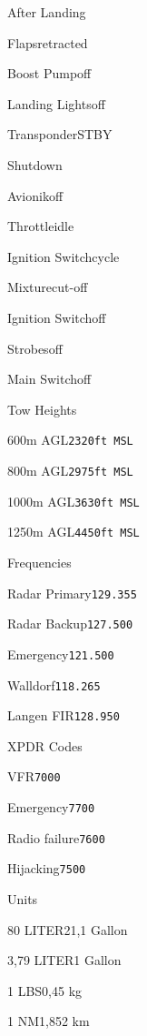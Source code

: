 \begin{checklist}{After Landing}
  \item{Flaps}{retracted}
  \item{Boost Pump}{off}
  \item{Landing Lights}{off}
  \item{Transponder}{STBY}
\end{checklist}

\begin{checklist}{Shutdown}
  \item{Avionik}{off}
  \item{Throttle}{idle}
  \item{Ignition Switch}{cycle}
  \item{Mixture}{cut-off}
  \item{Ignition Switch}{off}
  \item{Strobes}{off}
  \item{Main Switch}{off}
\end{checklist}

\begin{checklist}{Tow Heights}
  \item{600m AGL}{\texttt{2320ft MSL}}
  \item{800m AGL}{\texttt{2975ft MSL}}
  \item{1000m AGL}{\texttt{3630ft MSL}}
  \item{1250m AGL}{\texttt{4450ft MSL}}
\end{checklist}

\begin{checklist}{Frequencies}
  \item{Radar Primary}{\texttt{129.355}}
  \item{Radar Backup}{\texttt{127.500}}
  \item{Emergency}{\texttt{121.500}}
  \item{Walldorf}{\texttt{118.265}}
  \item{Langen FIR}{\texttt{128.950}}
\end{checklist}

\begin{checklist}{XPDR Codes}
  \item{VFR}{\texttt{7000}}
  \item{Emergency}{\texttt{7700}}
  \item{Radio failure}{\texttt{7600}}
  \item{Hijacking}{\texttt{7500}}
\end{checklist}

\begin{checklist}{Units}
  \item{80 LITER}{21,1 Gallon}
  \item{3,79 LITER}{1 Gallon}
  \item{1 LBS}{0,45 kg}
  \item{1 NM}{1,852 km}

\end{checklist}

